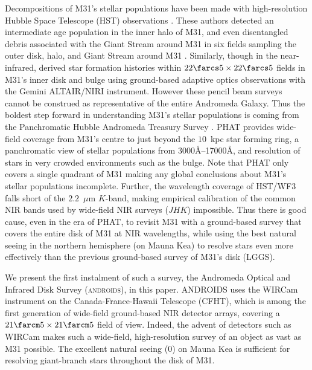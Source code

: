 \documentclass[iop,tighten]{emulateapj}
\newcommand{\androids}{\textsc{androids}}
\begin{document}
Decompositions of M31's stellar populations have been made with high-resolution Hubble Space Telescope (HST) observations \citep{Brown:2003,Brown:2006,Brown:2008}.
These authors detected an intermediate age population in the inner halo of M31, and even disentangled debris associated with the Giant Stream around M31 in six fields sampling the outer disk, halo, and Giant Stream around M31 \citep{Brown:2009a}.
Similarly, though in the near-infrared, \cite{Olsen:2006} derived star formation histories within $22\farcs5\times22\farcs5$ fields in M31's inner disk and bulge using ground-based adaptive optics observations with the Gemini ALTAIR/NIRI instrument.
However these pencil beam surveys cannot be construed as representative of the entire Andromeda Galaxy.
Thus the boldest step forward in understanding M31's stellar populations is coming from the Panchromatic Hubble Andromeda Treasury Survey \citep[PHAT,][]{Dalcanton:2012}.
PHAT provides wide-field coverage from M31's centre to just beyond the $10$~kpc star forming ring, a panchromatic view of stellar populations from 3000\AA--17000\AA, and resolution of stars in very crowded environments such as the bulge.
Note that PHAT only covers a single quadrant of M31 making any global conclusions about M31's stellar populations incomplete.
Further, the wavelength coverage of HST/WF3 falls short of the $2.2$~$\mu$m $K$-band, making empirical calibration of the common NIR bands used by wide-field NIR surveys ($JHK$) impossible.
Thus there is good cause, even in the era of PHAT, to revisit M31 with a ground-based survey that covers the entire disk of M31 at NIR wavelengths, while using the best natural seeing in the northern hemisphere (on Mauna Kea) to resolve stars even more effectively than the previous ground-based survey of M31's disk (LGGS).

We present the first instalment of such a survey, the Andromeda Optical and Infrared Disk Survey (\androids), in this paper.
ANDROIDS uses the WIRCam instrument \citep{Puget:2004} on the Canada-France-Hawaii Telescope (CFHT), which is among the first generation of wide-field ground-based NIR detector arrays, covering a $21\farcm 5 \times 21\farcm 5$ field of view.
Indeed, the advent of detectors such as WIRCam makes such a wide-field, high-resolution survey of an object as vast as M31 possible.
The excellent natural seeing (0) on Mauna Kea is sufficient for resolving giant-branch stars throughout the disk of M31.
\end{document}
